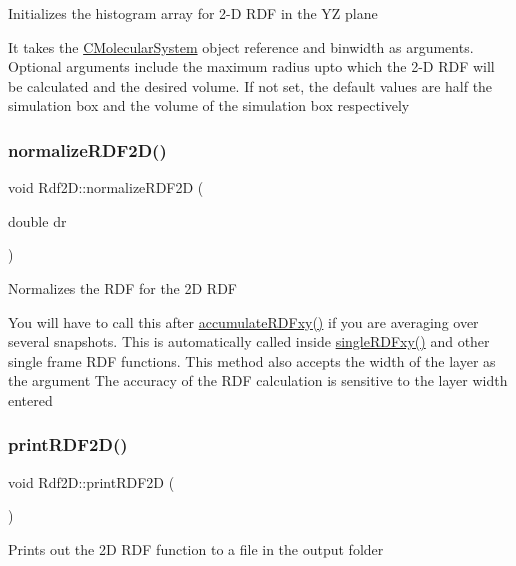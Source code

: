 Initializes the histogram array for 2-\/D R\+DF in the YZ plane

It takes the \mbox{\hyperlink{classCMolecularSystem}{C\+Molecular\+System}} object reference and binwidth as arguments. Optional arguments include the maximum radius upto which the 2-\/D R\+DF will be calculated and the desired volume. If not set, the default values are half the simulation box and the volume of the simulation box respectively \mbox{\label{classRdf2D_aaf6d00ec728e8c694ed2932332691c0d}} 
\subsubsection{\texorpdfstring{normalize\+R\+D\+F2\+D()}{normalizeRDF2D()}}
{\footnotesize\ttfamily void Rdf2\+D\+::normalize\+R\+D\+F2D (\begin{DoxyParamCaption}\item[{double}]{dr }\end{DoxyParamCaption})}

Normalizes the R\+DF for the 2D R\+DF

You will have to call this after \mbox{\hyperlink{classRdf2D_a6c716851d80fd2a7dcfefd219892d87b}{accumulate\+R\+D\+Fxy()}} if you are averaging over several snapshots. This is automatically called inside \mbox{\hyperlink{classRdf2D_afc5ff73aa9c126184e94ee3abfc14ff4}{single\+R\+D\+Fxy()}} and other single frame R\+DF functions. This method also accepts the width of the layer as the argument The accuracy of the R\+DF calculation is sensitive to the layer width entered \mbox{\label{classRdf2D_aae00c1526117f6ac63d2c13354b6c404}} 
\subsubsection{\texorpdfstring{print\+R\+D\+F2\+D()}{printRDF2D()}}
{\footnotesize\ttfamily void Rdf2\+D\+::print\+R\+D\+F2D (\begin{DoxyParamCaption}{ }\end{DoxyParamCaption})}

Prints out the 2D R\+DF function to a file in the output folder \mbox{\label{classRdf2D_afc5ff73aa9c126184e94ee3abfc14ff4}} 
